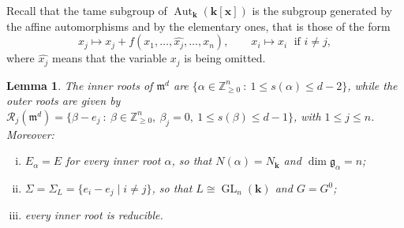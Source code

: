 \documentclass[11pt,letterpaper,reqno]{amsart}
\newtheorem{lemma}[lemma]{Lemma}
\theoremstyle{remark}
\theoremstyle{definition}
\def\M{\mathfrak{m}}
\def\XX{\mathbf{x}}
\newcommand{\KK}[0]{\ensuremath{\mathbf{k}}}
\newcommand{\ZZ}[0]{\ensuremath{\mathbb{Z}}}
\newcommand{\Aut}[0]{\ensuremath{\operatorname{Aut}}}
\newcommand{\GL}[0]{\ensuremath{\operatorname{GL}}}
\newcommand{\R}{\mathcal R}
\begin{document}
Recall that the tame subgroup of $\Aut_\KK(\KK[\XX])$ is the subgroup generated by
the affine automorphisms and by the elementary ones, that is those of the form
\[x_j\mapsto x_j+f(x_1,\dots,\widehat{x_j},\dots,x_n),\qquad
x_i\mapsto x_i\;\text{ if } i\neq j,\]
where $\widehat{x_j}$ means that the variable $x_j$ is being omitted.

\begin{lemma}\label{lem:anick-roots}
The inner roots of $\M^d$ are $\{\alpha\in\ZZ^n_{\geq 0}\ :\ 1\leq s(\alpha)\leq d-2\}$, while the outer roots are given by $\R_j(\M^d)=\{\beta-e_j\ :\ \beta\in\ZZ^n_{\geq0},\ \beta_j=0,\ 1\leq s(\beta)\leq d-1\}$, with $1\leq j\leq n$.
Moreover:
\begin{enumerate}[(i)]
\item $E_\alpha=E$ for every inner root $\alpha$, so that $N(\alpha)=N_\KK$ and
      $\dim\mathfrak g_\alpha=n$;
\item $\Sigma=\Sigma_L=\{e_i-e_j\mid i\neq j\}$, so that $L\cong\GL_n(\KK)$ and $G=G^0$;
\item every inner root is reducible.
\end{enumerate}
\end{lemma}
\end{document}
